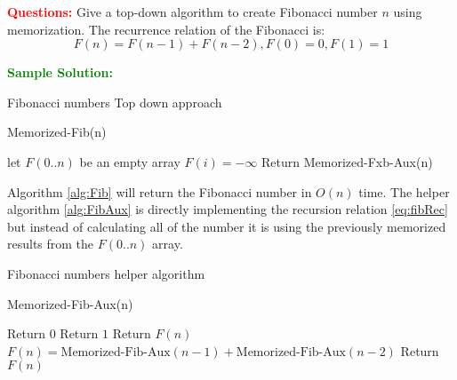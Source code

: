 \problem

\textcolor{Red}{\textbf{Questions:}}
Give a top-down algorithm to create Fibonacci number $n$ using memorization. The recurrence relation of the Fibonacci is:
\begin{equation}\label{eq:fibRec}
	F(n) = F(n-1) + F(n-2), F(0) = 0, F(1) = 1
\end{equation}

\textcolor{Green}{\textbf{Sample Solution:}}

\begin{algorithm}
	\caption{Fibonacci numbers Top down approach}\label{alg:Fib}
	Memorized-Fib(n)
	\begin{algorithmic}[1]
		\State let $F(0..n)$ be an empty array
		 \State $F(i) = -\infty$
		\EndFor
		\State Return Memorized-Fxb-Aux(n)
	\end{algorithmic}
\end{algorithm}

Algorithm \ref{alg:Fib} will return the Fibonacci number in $O(n)$ time. The helper algorithm \ref{alg:FibAux} is directly implementing the recursion relation \eqref{eq:fibRec} but instead of calculating all of the number it is using the previously memorized results from the $F(0..n)$ array.

\begin{algorithm}
	\caption{Fibonacci numbers helper algorithm}\label{alg:FibAux}
	Memorized-Fib-Aux(n)
	\begin{algorithmic}[1]
		 \State Return $0$
		 \State Return $1$
		 \State Return $F(n)$
		\EndIf
		\State $F(n) = \text{Memorized-Fib-Aux}(n-1) + \text{Memorized-Fib-Aux}(n-2)$
		\State Return $F(n)$
	\end{algorithmic}
\end{algorithm}
